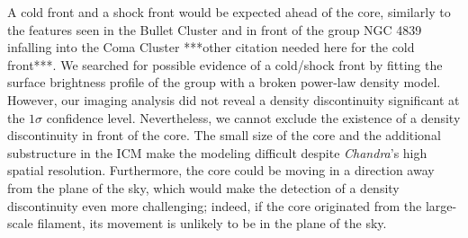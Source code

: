 A cold front and a shock front would be expected ahead of the core, similarly to the features seen in the Bullet Cluster \citep{Markevitch2002} and in front of the group NGC 4839 infalling into the Coma Cluster \citep{Neumann2001} ***other citation needed here for the cold front***. We searched for possible evidence of a cold/shock front by fitting the surface brightness profile of the group with a broken power-law density model. However, our imaging analysis did not reveal a density discontinuity significant at the $1\sigma$ confidence level. Nevertheless, we cannot exclude the existence of a density discontinuity in front of the core. The small size of the core and the additional substructure in the ICM make the modeling difficult despite \emph{Chandra}'s high spatial resolution. Furthermore, the core could be moving in a direction away from the plane of the sky, which would make the detection of a density discontinuity even more challenging; indeed, if the core originated from the large-scale filament, its movement is unlikely to be in the plane of the sky.


